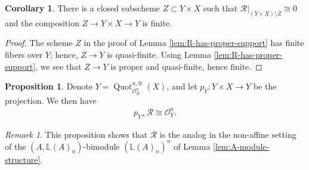 \documentclass{article}
\numberwithin{equation}{section}
\theoremstyle{quest}
\theoremstyle{definition}
\newtheorem{prop}[thm]{Proposition}
\newtheorem{cor}[thm]{Corollary}
\theoremstyle{remark}
\newtheorem{rmk}[thm]{Remark}
\DeclareMathOperator{\Quot}{Quot}
\begin{document}
\begin{cor}\label{cor:R-has-finite-support}
	There is a closed subscheme $Z\subset Y\times X$ such that $\mathscr{R}|_{(Y\times X)\setminus Z}\cong 0$ and the composition $Z\to Y\times X\to Y$ is finite.	
\end{cor} 
\begin{proof}
	The scheme $Z$ in the proof of Lemma \ref{lem:R-has-proper-support} has finite fibers over $Y$; hence, $Z\to Y$ is quasi-finite. Using Lemma \ref{lem:R-has-proper-support}, we see that $Z\to Y$ is proper and quasi-finite, hence finite.
\end{proof} 
\begin{prop}\label{prop:R-is-free-of-rank-n}
 Denote $Y= \Quot^{n,\text{fr}}_{\mathscr{O}_X^n}(X)$, and let $p_Y:Y\times X\to Y$ be the projection. We then have
 \begin{align*}
 	p_{Y*}\mathscr{R}\cong \mathscr{O}^n_Y.
 \end{align*} 
\end{prop} 
\begin{rmk}
This proposition shows that $\mathscr{R}$ is the analog in the non-affine setting of the $(A,\mathbb{L}(A)_n)$-bimodule $(\mathbb{L}(A)_n)^n$ of Lemma \ref{lem:A-module-structure}.
\end{rmk} 
\end{document}
